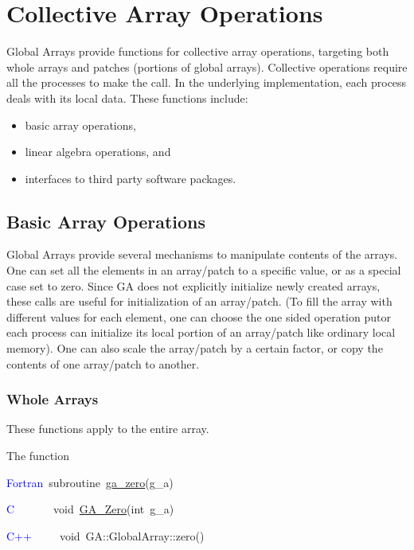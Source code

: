\chapter{Collective Array Operations}

Global Arrays provide functions for collective array operations, targeting
both whole arrays and patches (portions of global arrays). Collective
operations require all the processes to make the call. In the underlying
implementation, each process deals with its local data. These functions
include:
\begin{itemize}
\item basic array operations, 
\item linear algebra operations, and 
\item interfaces to third party software packages.
\end{itemize}

\section{Basic Array Operations }

Global Arrays provide several mechanisms to manipulate contents of
the arrays. One can set all the elements in an array/patch to a specific
value, or as a special case set to zero. Since GA does not explicitly
initialize newly created arrays, these calls are useful for initialization
of an array/patch. (To fill the array with different values for each
element, one can choose the one sided operation putor each process
can initialize its local portion of an array/patch like ordinary local
memory). One can also scale the array/patch by a certain factor, or
copy the contents of one array/patch to another. 


\subsection{Whole Arrays }

These functions apply to the entire array.

The function

\textcolor{blue}{Fortran}~subroutine~\href{https://hpc.pnl.gov/globalarrays/api/f_op_api.html\#ga_zero}{ga\_{}zero}(g\_a)~

\textcolor{blue}{C}~~~~~~~void~\href{https://hpc.pnl.gov/globalarrays/api/c_op_api.html\#ga_zero}{GA\_{}Zero}(int~g\_a)~

\textcolor{blue}{C++}~~~~~void~GA::GlobalArray::zero()


